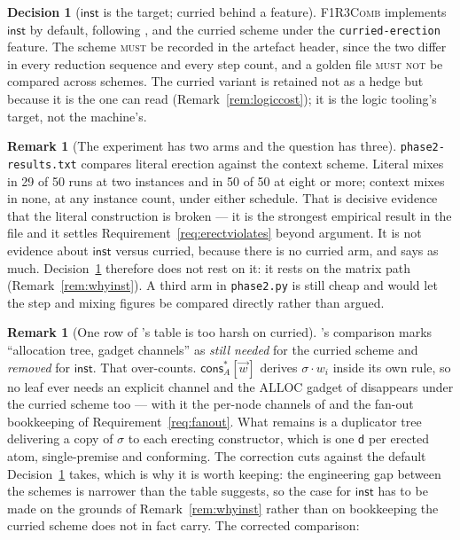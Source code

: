\documentclass[11pt,a4paper]{article}
\newcommand{\code}[1]{\texttt{#1}}
\newcommand{\Comb}{\textsc{F1R3Comb}}
\newcommand{\MUST}{\textsc{must}}
\newcommand{\MUSTNOT}{\textsc{must not}}
\newcommand{\dd}{\mathsf{d}}
\newcommand{\cons}{\mathsf{cons}}
\newcommand{\ALLOC}{\mathrm{ALLOC}}
\newcommand{\inst}{\mathsf{inst}}
\theoremstyle{definition}
\newtheorem{decision}[definition]{Decision}
\newtheorem{remark}[definition]{Remark}
\theoremstyle{plain}
\begin{document}
\begin{decision}[$\inst$ is the target; curried behind a feature]
\label{dec:scheme}
\Comb{} implements $\inst$ by default, following
\cite[Rem.~6.22]{draft3}, and the curried scheme under the
\code{curried-erection} feature. The scheme \MUST{} be recorded in the
artefact header, since the two differ in every reduction sequence and every
step count, and a golden file \MUSTNOT{} be compared across schemes. The
curried variant is retained not as a hedge but because it is the one
\cite{logic} can read (Remark~\ref{rem:logiccost}); it is the logic tooling's
target, not the machine's.
\end{decision}

\begin{remark}[The experiment has two arms and the question has three]
\label{rem:thirdarm}
\code{phase2-results.txt} compares literal erection against the context
scheme. Literal mixes in 29 of 50 runs at two instances and in 50 of 50 at
eight or more; context mixes in none, at any instance count, under either
schedule. That is decisive evidence that the literal construction is broken
--- it is the strongest empirical result in the file and it settles
Requirement~\ref{req:erectviolates} beyond argument. It is not evidence about
$\inst$ versus curried, because there is no curried arm, and
\cite[Rem.~6.22]{draft3} says as much. Decision~\ref{dec:scheme} therefore
does not rest on it: it rests on the matrix path
(Remark~\ref{rem:whyinst}). A third arm in \code{phase2.py} is still cheap and
would let the step and mixing figures be compared directly rather than argued.
\end{remark}

\begin{remark}[One row of \cite{draft3}'s table is too harsh on curried]
\label{rem:tablerow}
\cite[\S6.7]{draft3}'s comparison marks ``allocation tree, gadget channels''
as \emph{still needed} for the curried scheme and \emph{removed} for $\inst$.
That over-counts. $\cons^{*}_{A}[\vec w]$ derives $\sigma\!\cdot\!w_{i}$
inside its own rule, so no leaf ever needs an explicit channel and the
$\ALLOC$ gadget of \cite[Def.~6.6]{draft3} disappears under the curried scheme
too --- with it the per-node channels of \cite[Rem.~6.13]{draft3} and the
fan-out bookkeeping of Requirement~\ref{req:fanout}. What remains is a
duplicator tree delivering a copy of $\sigma$ to each erecting constructor,
which is one $\dd$ per erected atom, single-premise and conforming. The
correction cuts against the default Decision~\ref{dec:scheme} takes, which is
why it is worth keeping: the engineering gap between the schemes is narrower
than the table suggests, so the case for $\inst$ has to be made on the grounds
of Remark~\ref{rem:whyinst} rather than on bookkeeping the curried scheme does
not in fact carry. The corrected comparison:
\end{remark}
\end{document}
